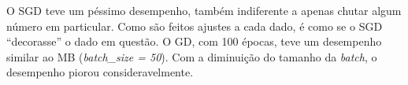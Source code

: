 \documentclass[a4paper]{article}
\begin{document}
O SGD teve um péssimo desempenho, também indiferente a apenas chutar algum número em particular. Como são feitos ajustes a cada dado, é como se o SGD “decorasse” o dado em questão. O GD, com 100 épocas, teve um desempenho similar ao MB (\textit{batch\_size = 50}). Com a diminuição do tamanho da \textit{batch}, o desempenho piorou consideravelmente.
\end{document}
